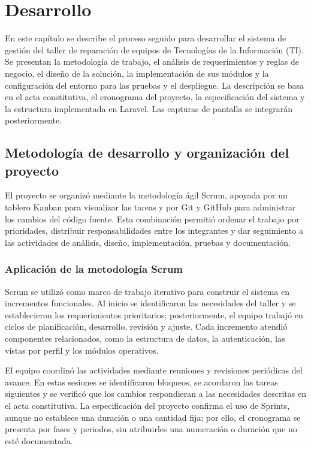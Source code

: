 \chapter{Desarrollo}

En este capítulo se describe el proceso seguido para desarrollar el sistema de gestión del taller de reparación de equipos de Tecnologías de la Información (TI). Se presentan la metodología de trabajo, el análisis de requerimientos y reglas de negocio, el diseño de la solución, la implementación de sus módulos y la configuración del entorno para las pruebas y el despliegue. La descripción se basa en el acta constitutiva, el cronograma del proyecto, la especificación del sistema y la estructura implementada en Laravel. Las capturas de pantalla se integrarán posteriormente.

\section{Metodología de desarrollo y organización del proyecto}

El proyecto se organizó mediante la metodología ágil Scrum, apoyada por un tablero Kanban para visualizar las tareas y por Git y GitHub para administrar los cambios del código fuente. Esta combinación permitió ordenar el trabajo por prioridades, distribuir responsabilidades entre los integrantes y dar seguimiento a las actividades de análisis, diseño, implementación, pruebas y documentación.

\subsection{Aplicación de la metodología Scrum}

Scrum se utilizó como marco de trabajo iterativo para construir el sistema en incrementos funcionales. Al inicio se identificaron las necesidades del taller y se establecieron los requerimientos prioritarios; posteriormente, el equipo trabajó en ciclos de planificación, desarrollo, revisión y ajuste. Cada incremento atendió componentes relacionados, como la estructura de datos, la autenticación, las vistas por perfil y los módulos operativos.

El equipo coordinó las actividades mediante reuniones y revisiones periódicas del avance. En estas sesiones se identificaron bloqueos, se acordaron las tareas siguientes y se verificó que los cambios respondieran a las necesidades descritas en el acta constitutiva. La especificación del proyecto confirma el uso de Sprints, aunque no establece una duración o una cantidad fija; por ello, el cronograma se presenta por fases y periodos, sin atribuirles una numeración o duración que no esté documentada.

